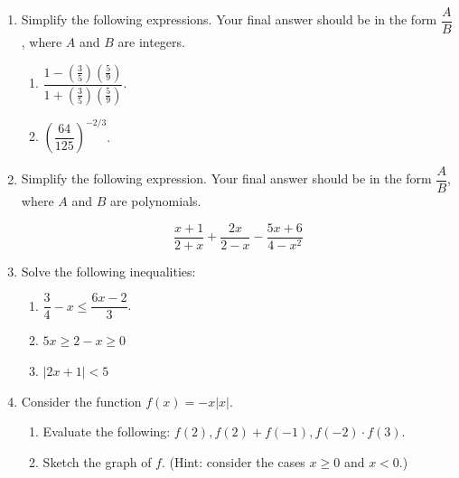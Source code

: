 \documentclass[12pt]{article}
\newcommand{\points}[1]{\marginpar{\hspace{24pt}[#1]}}
\newcommand{\di}{\displaystyle}
\begin{document}
\begin{enumerate}
\item Simplify the following expressions. Your final answer should be in the form $\dfrac{A}{B}$, where $A$ and $B$ are integers.
\begin{enumerate}
 \item $\dfrac{1-\left(\frac{3}{5}\right)\left(\frac{5}{9}\right)}{1+\left(\frac{3}{5}\right)\left(\frac{5}{9}\right)}$. \points{3}

\vspace{1.75in}

 \item $\left(\dfrac{64}{125}\right)^{-2/3}$. \points{3}

\vspace{1.75in}

\end{enumerate}
\item Simplify the following expression. Your final answer should be in the form $\dfrac{A}{B}$, where $A$ and $B$ are polynomials.\points{4} 

\[
\di \frac{x+1}{2+x}+\frac{2x}{2-x}-\frac{5x+6}{4-x^2} 
\]

\newpage

\item Solve the following inequalities:
\begin{enumerate}
 \item $\dfrac{3}{4}-x \leq \dfrac{6x-2}{3}$. \points{3}

\vspace{2in}

 \item $5x\geq 2-x\geq 0$ \points{4}

\vspace{2in}

 \item $\lvert 2x+1\rvert <5$ \points{3}
\end{enumerate}
\newpage

\item Consider the function $f(x) = -x\lvert x\rvert$.
\begin{enumerate}
 \item Evaluate the following: $f(2), f(2) + f(-1), f(-2)\cdot f(3)$. \points{3}

\vspace{1.5in}

 \item Sketch the graph of $f$. (Hint: consider the cases $x\geq 0$ and $x<0$.) \points{3}


\end{enumerate}
\end{enumerate}
\end{document}
